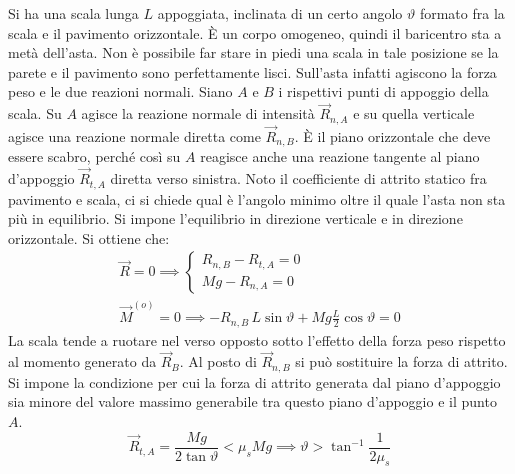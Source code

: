 \documentclass[10pt,a4paper]{book}
\begin{document}
\begin{figure}[htpb]
\end{figure}
\FloatBarrier
Si ha una scala lunga $L$ appoggiata, inclinata di un certo angolo $\vartheta$ formato fra la scala e il pavimento orizzontale. È un corpo omogeneo, quindi il baricentro sta a metà dell'asta. Non è possibile far stare in piedi una scala in tale posizione se la parete e il pavimento sono perfettamente lisci. Sull'asta infatti agiscono la forza peso e le due reazioni normali. Siano $A$ e $B$ i rispettivi punti di appoggio della scala. Su $A$ agisce la reazione normale di intensità $\vec{R}_{n,A}$ e su quella verticale agisce una reazione normale diretta come $\vec{R}_{n,B}$. È il piano orizzontale che deve essere scabro, perché così su $A$ reagisce anche una reazione tangente al piano d'appoggio $\vec{R}_{t,A}$ diretta verso sinistra. Noto il coefficiente di attrito statico fra pavimento e scala, ci si chiede qual è l'angolo minimo oltre il quale l'asta non sta più in equilibrio.
Si impone l'equilibrio in direzione verticale e in direzione orizzontale. Si ottiene che:
\begin{gather*}
	\vec{R} = 0 \implies \left\{ \begin{array}{l}
	 	R_{n,B}-R_{t,A} = 0 \\
		Mg-R_{n,A} = 0
	\end{array} \right. \\
	\vec{M}^{(o)} = 0 \implies -R_{n,B}\,L\sin \vartheta + Mg\frac{L}{2}\cos \vartheta = 0
\end{gather*}
La scala tende a ruotare nel verso opposto sotto l'effetto della forza peso rispetto al momento generato da $\vec{R}_B$. Al posto di $\vec{R}_{n,B}$ si può sostituire la forza di attrito. Si impone la condizione per cui la forza di attrito generata dal piano d'appoggio sia minore del valore massimo generabile tra questo piano d'appoggio e il punto $A$.
\[
	\vec{R}_{t,A}= \frac{Mg}{2\tan \vartheta } < \mu_s Mg \implies \vartheta > \tan^{-1} \frac{1}{2\mu_s}
\]
\end{document}
